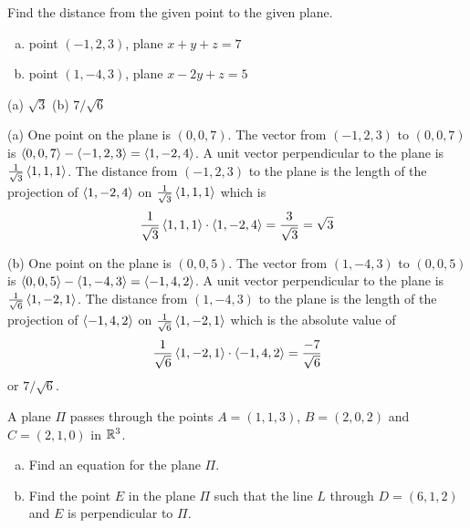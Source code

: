 \begin{question}
Find the distance from the given point to the given plane.
\begin{enumerate}[(a)]
\item
point $(-1,2,3)$, plane $x+y+z=7$
\item
point $(1,-4,3)$, plane $x-2y+z=5$ 
\end{enumerate}
\end{question}

%

\begin{answer}
(a) $\sqrt{3}$\qquad
(b) $7/\sqrt{6}$
\end{answer}

\begin{solution}
(a) One point on the plane is $(0,0,7)$. The vector from $(-1,2,3)$
to $(0,0,7)$ is $\left< 0,0,7\right> -\left< -1,2,3\right> =\left< 1,-2,4\right> $. 
A unit vector perpendicular to the plane is 
$\frac{1}{\sqrt{3}}\left< 1,1,1\right> $. The distance from  
$(-1,2,3)$ to the plane is the length of the projection of 
$\left< 1,-2,4\right> $ on $\frac{1}{\sqrt{3}}\left< 1,1,1\right> $ which is \begin{align*}
\frac{1}{\sqrt{3}}\left< 1,1,1\right> \cdot\left< 1,-2,4\right> 
=\frac{3}{\sqrt{3}}
=\sqrt{3}
\end{align*}

(b) One point on the plane is $(0,0,5)$. The vector from 
$(1,-4,3)$ to $(0,0,5)$ is $\left< 0,0,5\right> -\left< 1,-4,3\right> =\left< -1,4,2\right>$. A unit vector perpendicular to the plane is 
$\frac{1}{\sqrt{6}}\left< 1,-2,1\right> $. The distance from  
$(1,-4,3)$ to the plane is the length of the projection of 
$\left< -1,4,2\right> $ on $\frac{1}{\sqrt{6}}\left< 1,-2,1\right> $ which is 
the absolute value of 
\begin{equation*}
\frac{1}{\sqrt{6}}\left< 1,-2,1\right> \cdot \left< -1,4,2\right> 
=\frac{-7}{\sqrt{6}}
\end{equation*}
or $7/\sqrt{6}$.
\end{solution}



\begin{question}[M200 2007A] %
A plane $\Pi$ passes through the points $A = (1, 1, 3)$, $B = (2, 0, 2)$ 
and $C = (2, 1, 0)$ in $\mathbb{R}^3$.
\begin{enumerate}[(a)]
\item
 Find an equation for the plane $\Pi$.
\item
 Find the point $E$ in the plane $\Pi$ such that the line $L$ through 
$D = (6, 1, 2)$ and $E$ is perpendicular to $\Pi$.
\end{enumerate}
\end{question}

